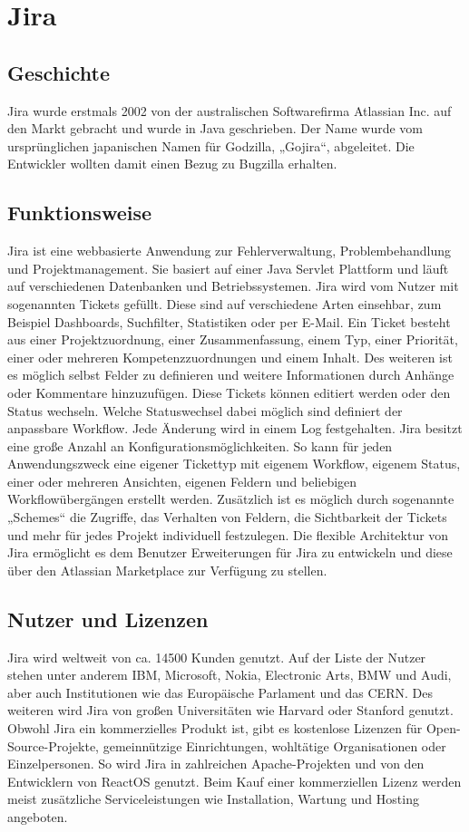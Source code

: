\section{Jira}
\subsection{Geschichte}
Jira wurde erstmals 2002 von der australischen Softwarefirma Atlassian Inc. auf den Markt gebracht und wurde in Java geschrieben. Der Name wurde vom ursprünglichen japanischen Namen für Godzilla, „Gojira“, abgeleitet. Die Entwickler wollten damit einen Bezug zu Bugzilla erhalten.
\subsection{Funktionsweise}
Jira ist eine webbasierte Anwendung zur Fehlerverwaltung, Problembehandlung und Projektmanagement. Sie basiert auf einer Java Servlet Plattform und läuft auf verschiedenen Datenbanken und Betriebssystemen. Jira wird vom Nutzer mit sogenannten Tickets gefüllt. Diese sind auf verschiedene Arten einsehbar, zum Beispiel Dashboards, Suchfilter, Statistiken oder per E-Mail. Ein Ticket besteht aus einer Projektzuordnung, einer Zusammenfassung, einem Typ, einer Priorität, einer oder mehreren Kompetenzzuordnungen und einem Inhalt. Des weiteren ist es möglich selbst Felder zu definieren und weitere Informationen durch Anhänge oder Kommentare hinzuzufügen. Diese Tickets können editiert werden oder den Status wechseln. Welche Statuswechsel dabei möglich sind definiert der anpassbare Workflow. Jede Änderung wird in einem Log festgehalten. Jira besitzt eine große Anzahl an Konfigurationsmöglichkeiten. So kann für jeden Anwendungszweck eine eigener Tickettyp mit eigenem Workflow, eigenem Status, einer oder mehreren Ansichten, eigenen Feldern und beliebigen Workflowübergängen erstellt werden. Zusätzlich ist es möglich durch sogenannte „Schemes“ die Zugriffe, das Verhalten von Feldern, die Sichtbarkeit der Tickets und mehr für jedes Projekt individuell festzulegen. Die flexible Architektur von Jira ermöglicht es dem Benutzer Erweiterungen für Jira zu entwickeln und diese über den Atlassian Marketplace zur Verfügung zu stellen.
\subsection{Nutzer und Lizenzen}
Jira wird weltweit  von ca. 14500 Kunden genutzt. Auf der Liste der Nutzer stehen unter anderem IBM, Microsoft, Nokia, Electronic Arts, BMW und Audi, aber auch Institutionen wie das Europäische Parlament und das CERN. Des weiteren wird Jira von großen Universitäten wie Harvard oder Stanford genutzt. Obwohl Jira ein kommerzielles Produkt ist, gibt es kostenlose Lizenzen für Open-Source-Projekte, gemeinnützige Einrichtungen, wohltätige Organisationen oder Einzelpersonen. So wird Jira in zahlreichen Apache-Projekten und von den Entwicklern von ReactOS genutzt. Beim Kauf einer kommerziellen Lizenz werden meist zusätzliche Serviceleistungen wie Installation, Wartung und Hosting angeboten.